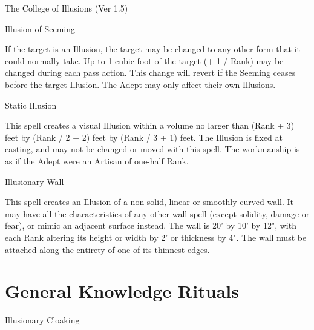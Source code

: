 \begin{Chapter}{The College of Illusions (Ver 1.5)}
\begin{spell}[G-6]{Illusion of Seeming}
\begin{effects}
If the target is an Illusion, the target may be changed to any other
form that it could normally take. Up to 1 cubic foot of the target (+
1 / Rank) may be changed during each pass action.  This change will
revert if the Seeming ceases before the target Illusion.  The Adept
may only affect their own Illusions.
\end{effects}
\end{spell}

\begin{spell}[G-7]{Static Illusion}

\begin{effects}
This spell creates a visual Illusion within a volume no larger than
(Rank + 3) feet by (Rank / 2 + 2) feet by (Rank / 3 + 1) feet.  The
Illusion is fixed at casting, and may not be changed or moved with
this spell. The workmanship is as if the Adept were an Artisan of
one-half Rank.
\end{effects}
\end{spell}

\begin{spell}[G-8]{Illusionary Wall}

\begin{effects}
This spell creates an Illusion of a non-solid, linear or smoothly
curved wall.  It may have all the characteristics of any other wall
spell (except solidity, damage or fear), or mimic an adjacent surface
instead. The wall is 20’ by 10’ by 12", with each Rank altering its
height or width by 2’ or thickness by 4".  The wall must be attached
along the entirety of one of its thinnest edges.
\end{effects}
\end{spell}

\section{General Knowledge Rituals}

\begin{ritual}[Q-1]{Illusionary Cloaking}


\end{ritual}
\end{Chapter}
